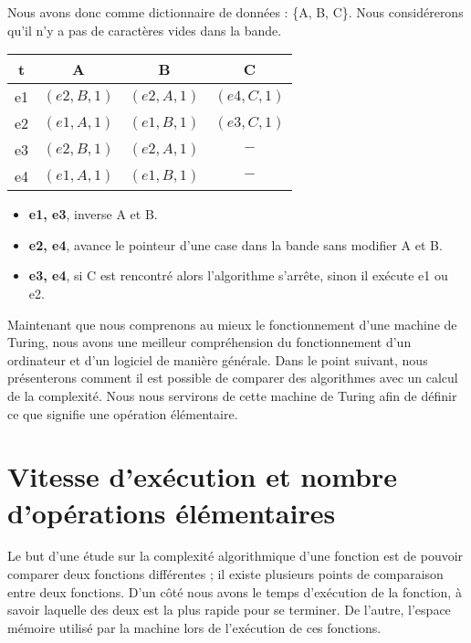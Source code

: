 \documentclass[12pt, twoside, openright]{report}
\begin{document}
Nous avons donc comme dictionnaire de données : \{A, B, C\}. Nous considérerons qu'il n'y a pas de caractères vides dans la bande.

\begin{center}
    \begin{tabular}{|c|c|c|c|}
        \hline 
t        &A  & B & C \\ 
        \hline 
e1        &$(e2, B, 1)$   & $(e2, A, 1)$  & $(e4, C, 1)$  \\ 
        \hline 
e2        & $(e1, A, 1)$  & $(e1, B, 1)$  & $(e3, C, 1)$  \\ 
        \hline 
e3        &$(e2, B, 1)$  & $(e2, A, 1)$  & $-$ \\ 
        \hline 
e4        &$(e1, A, 1)$   & $(e1, B, 1)$  &  $-$\\ 
        \hline 
    \end{tabular}
\end{center}
\vspace{0.4cm}
\begin{itemize}
    \item \textbf{e1, e3}, inverse A et B.
    \item \textbf{e2, e4}, avance le pointeur d'une case dans la bande sans modifier A et B. 
    \item \textbf{e3, e4}, si C est rencontré alors l'algorithme s'arrête, sinon il exécute e1 ou e2.
\end{itemize}

\vspace{0.4cm}

Maintenant que nous comprenons au mieux le fonctionnement d'une machine de Turing, nous avons une meilleur compréhension du fonctionnement d'un ordinateur et d'un logiciel de manière générale. Dans le point suivant, nous présenterons comment il est possible de comparer des algorithmes avec un calcul de la complexité. Nous nous servirons de cette machine de Turing  afin de définir ce que signifie une opération élémentaire.

\section{Vitesse d'exécution et nombre d'opérations élémentaires}

Le but d'une étude sur la complexité algorithmique d'une fonction est de pouvoir comparer deux fonctions différentes ; il existe plusieurs points de comparaison entre deux fonctions. D'un côté nous avons le temps d'exécution de la fonction, à savoir laquelle des deux est la plus rapide pour se terminer. De l'autre, l'espace mémoire utilisé par la machine lors de l'exécution de ces fonctions. 
\end{document}
